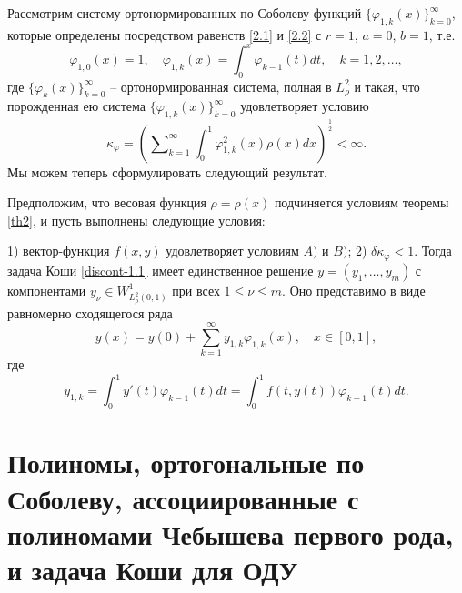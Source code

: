 Рассмотрим систему ортонормированных по Соболеву функций $\{\varphi_{1,k}(x)\}_{k=0}^\infty$, которые определены  посредством равенств \eqref{2.1} и \eqref{2.2} с $r=1$, $a=0$, $b=1$,  т.е.
\begin{equation}\label{discont-3.2}
\varphi_{1,0}(x)=1, \quad \varphi_{1,k}(x)= \int_0^x\varphi_{k-1}(t)dt,\quad k=1,2,\ldots,
\end{equation}
где $\{\varphi_{k}(x)\}_{k=0}^\infty$ -- ортонормированная система, полная в $L_{\rho}^2$ и такая, что порожденная ею система $\{\varphi_{1,k}(x)\}_{k=0}^\infty$ удовлетворяет  условию
\begin{equation}\label{discont-3.3}
\kappa_\varphi=\left(\sum\nolimits_{k=1}^\infty \int_0^1\varphi^2_{1,k}(x)\rho(x)dx\right)^\frac12<\infty.
\end{equation}
Мы можем   теперь сформулировать следующий результат.
\begin{theorem}\label{discont-th3.3}
	Предположим, что весовая функция $\rho = \rho(x)$ подчиняется условиям теоремы \ref{th2}, и пусть выполнены следующие условия:
	
	1) вектор-функция $f(x,y)$ удовлетворяет условиям $A)$ и $B)$;
	2) $\delta\kappa_\varphi<1$.
	Тогда задача Коши \eqref{discont-1.1} имеет  единственное решение $y=(y_1,\ldots,y_m)$ с компонентами $y_\nu\in W^1_{L^2_\rho(0,1)}$ при всех $1\le\nu\le m$. Оно
	представимо в виде равномерно сходящегося ряда
	\begin{equation}\label{discont-3.4}
	y(x)=y(0)+\sum_{k=1}^\infty y_{1,k} \varphi_{1,k}(x), \quad x\in[0,1],
	\end{equation}
	где
	$$
	y_{1,k}=\int_{0}^{1} y'(t)\varphi_{k-1}(t)dt=\int_{0}^{1} f(t,y(t))\varphi_{k-1}(t)dt.
	$$
\end{theorem}

\chapter{Полиномы, ортогональные по Соболеву, ассоциированные с полиномами Чебышева первого рода, и задача Коши для ОДУ}



